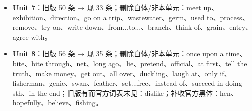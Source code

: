 \documentclass[UTF8,a4paper,11pt,oneside]{ctexbook}
\begin{document}
\begin{itemize}[leftmargin=2.2em,itemsep=0.25ex,topsep=0.3ex,label={\textcolor{mainblue}{\small\textbullet}}]
\item \textbf{\textcolor{mainblue}{Unit 7}}：旧版 50 条 → 现 33 条；删除白体/非本单元：meet up、exhibition、direction、go on a trip、wastewater、germ、used to、process、remove、try on、write down、from...to...、branch、think of、grain、entry、agree with。
\item \textbf{\textcolor{mainblue}{Unit 8}}：旧版 56 条 → 现 35 条；删除白体/非本单元：once upon a time、bite、bite through、net、long ago、lie、pretend、official、at first、tell the truth、make money、get out、all over、duckling、laugh at、only if、fisherman、genie、swan、feather、set...free、instead of、succeed in doing sth、in the end；旧版有而官方词表未见：dislike；补收官方黑体：hen、hopefully、believe、fishing。
\end{itemize}
\par\addvspace{0.75em}\par
\vspace{0.12em}\noindent{\color{rulelight}\rule{\linewidth}{0.55pt}}\par
\addvspace{0.2em}
\end{document}
